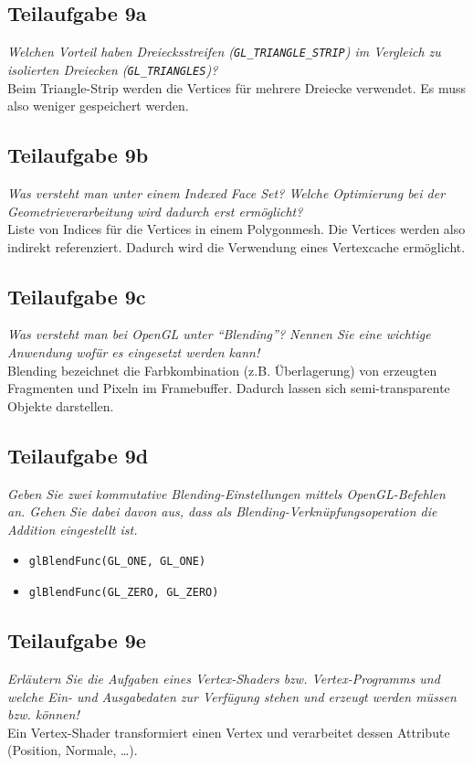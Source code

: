 \documentclass[a4paper]{scrartcl}
\begin{document}
\subsection*{Teilaufgabe 9a}
\textit{Welchen Vorteil haben Dreiecksstreifen (\texttt{GL\_TRIANGLE\_STRIP})
im Vergleich zu isolierten Dreiecken (\texttt{GL\_TRIANGLES})?}\\
Beim Triangle-Strip werden die Vertices für mehrere Dreiecke verwendet. Es muss
also weniger gespeichert werden.

\subsection*{Teilaufgabe 9b}
\textit{Was versteht man unter einem Indexed Face Set? Welche Optimierung bei
der Geometrieverarbeitung wird dadurch erst ermöglicht?}\\
Liste von Indices für die Vertices in einem Polygonmesh. Die Vertices werden
also indirekt referenziert. Dadurch wird die Verwendung eines Vertexcache
ermöglicht.

\subsection*{Teilaufgabe 9c}
\textit{Was versteht man bei OpenGL unter \enquote{Blending}? Nennen Sie eine
wichtige Anwendung wofür es eingesetzt werden kann!}\\
Blending bezeichnet die Farbkombination (z.B. Überlagerung) von erzeugten
Fragmenten und Pixeln im Framebuffer. Dadurch lassen sich semi-transparente
Objekte darstellen.

\subsection*{Teilaufgabe 9d}
\textit{Geben Sie zwei kommutative Blending-Einstellungen mittels OpenGL-Befehlen an.
Gehen Sie dabei davon aus, dass als Blending-Verknüpfungsoperation die Addition
eingestellt ist.}\\

\begin{itemize}
    \item \texttt{glBlendFunc(GL\_ONE, GL\_ONE)}
    \item \texttt{glBlendFunc(GL\_ZERO, GL\_ZERO)}
\end{itemize}

\subsection*{Teilaufgabe 9e}
\textit{Erläutern Sie die Aufgaben eines Vertex-Shaders bzw. Vertex-Programms
und welche Ein- und Ausgabedaten zur Verfügung stehen und erzeugt werden müssen
bzw. können!}\\
Ein Vertex-Shader transformiert einen Vertex und verarbeitet dessen Attribute
(Position, Normale, \dots).
\end{document}
